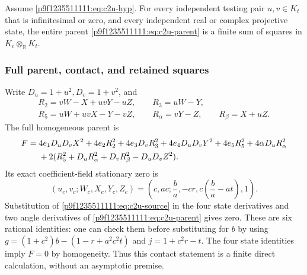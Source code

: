 \begin{theorem}
\label{p9f1235511111:thm:c2u}
Assume \eqref{p9f1235511111:eq:c2u-hyp}.  For every independent testing pair
$u,v\in K_t$ that is infinitesimal or zero, and every independent real
or complex projective state, the entire parent
\eqref{p9f1235511111:eq:c2u-parent} is a finite sum of squares in
$K_c\otimes_{\mathbb R}K_t$.
\end{theorem}

\subsubsection*{Full parent, contact, and retained squares}
Write $D_u=1+u^2,D_v=1+v^2$, and
\[
\begin{gathered}
R_2=vW-X+uvY-uZ,\qquad R_3=uW-Y,\\
R_5=uW+uvX-Y-vZ,\qquad R_\alpha=vY-Z,\qquad R_\beta=X+uZ.
\end{gathered}
\]
The full homogeneous parent is
\begin{align}
F={}&4e_1D_uD_vX^2+4e_2R_2^2+4e_3D_vR_3^2
 +4e_4D_uD_vY^2+4e_5R_5^2+4\alpha D_uR_\alpha^2\notag\\
 &+2(R_5^2+D_uR_\alpha^2+D_vR_\beta^2-D_uD_vZ^2).
\label{p9f1235511111:eq:c2u-parent}
\end{align}
Its exact coefficient-field stationary zero is
\begin{equation}
(u_c,v_c;W_c,X_c,Y_c,Z_c)
=\left(c,ac;\frac ba,-cr,c\left(\frac ba-at\right),1\right).
\label{p9f1235511111:eq:c2u-contact}
\end{equation}
Substitution of \eqref{p9f1235511111:eq:c2u-source} in the four state derivatives and
two angle derivatives of \eqref{p9f1235511111:eq:c2u-parent} gives zero. These are six
rational identities: one can check them before substituting for $b$ by
using $g=(1+c^2)b-(1-r+a^2c^2t)$ and $j=1+c^2r-t$.
The four state identities imply $F=0$ by homogeneity. Thus this contact
statement is a finite direct calculation, without an asymptotic premise.

